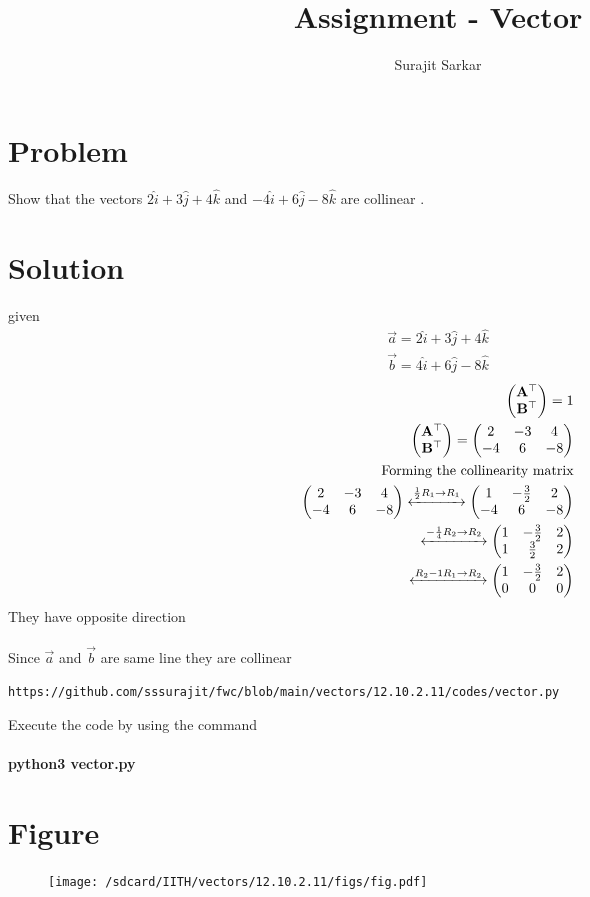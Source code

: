\documentclass[journal,12pt,twocolumn]{IEEEtran}
\title{\mytitle}
\title{
Assignment - Vector
}
\author{Surajit Sarkar}
\newcommand{\myvec}[1]{\ensuremath{\begin{pmatrix}#1\end{pmatrix}}}
\let\vec\mathbf
\begin{document}
\maketitle
\tableofcontents
\bigskip
\section{\textbf{Problem}}
Show that the vectors $2\hat{i}+3\hat{j}+4\hat{k}$ and $-4\hat{i}+6\hat{j}-8\hat{k}$ are collinear .
\section{\textbf{Solution}}
given
\begin{align}
\overrightarrow{a}=2\hat{i}+3\hat{j}+4\hat{k}\\
\overrightarrow{b}=4\hat{i}+6\hat{j}-8\hat{k}
\end{align}
\begin{align}
    \myvec{\vec{A}^{\top}\\ \vec{B}^{\top}}=1\\
\myvec{\vec{A}^{\top}\\ \vec{B}^{\top}}=\myvec{2&-3&4\\-4&6&-8}\\
\text{Forming the collinearity matrix}\\
\myvec{2&-3&4\\-4&6&-8} \xleftrightarrow{\frac{1}{2}R_1\to R_1}\myvec{1&-\frac{3}{2}&2\\-4&6&-8}\\
\xleftrightarrow{-\frac{1}{4}R_2\to R_2}\myvec{1&-\frac{3}{2}&2\\1&\frac{3}{2}&2}\\
\xleftrightarrow{R_2-1R_1\to R_2}\myvec{1&-\frac{3}{2}&2\\0&0&0}
\end{align}
  They have opposite direction \\
  \\
  Since $\overrightarrow{a}$ and $\overrightarrow{b}$ are same line they are collinear
\begin{lstlisting}
https://github.com/sssurajit/fwc/blob/main/vectors/12.10.2.11/codes/vector.py
\end{lstlisting}
Execute the code by using the command\\
\\
\textbf{python3 vector.py}\\
\section{\textbf{Figure}}
\begin{figure}[!ht]
    \centering
\texttt{[image: /sdcard/IITH/vectors/12.10.2.11/figs/fig.pdf]}
\caption{}
\label{fig:vec}
\end{figure}
\end{document}
